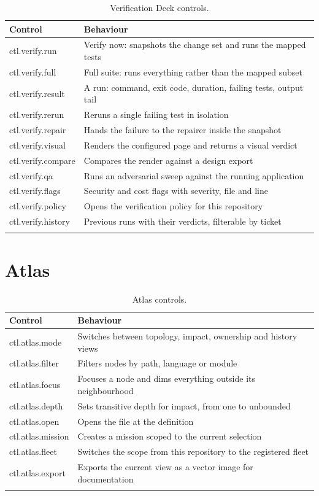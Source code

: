\begin{longtable}{@{}p{} p{}@{}}
\toprule
\textbf{Control} & \textbf{Behaviour} \\
\midrule
\endhead
ctl.verify.run & Verify now: snapshots the change set and runs the mapped tests \\
ctl.verify.full & Full suite: runs everything rather than the mapped subset \\
ctl.verify.result & A run: command, exit code, duration, failing tests, output tail \\
ctl.verify.rerun & Reruns a single failing test in isolation \\
ctl.verify.repair & Hands the failure to the repairer inside the snapshot \\
ctl.verify.visual & Renders the configured page and returns a visual verdict \\
ctl.verify.compare & Compares the render against a design export \\
ctl.verify.qa & Runs an adversarial sweep against the running application \\
ctl.verify.flags & Security and cost flags with severity, file and line \\
ctl.verify.policy & Opens the verification policy for this repository \\
ctl.verify.history & Previous runs with their verdicts, filterable by ticket \\
\bottomrule
\caption{Verification Deck controls.}
\end{longtable}

\section{Atlas}

\begin{longtable}{@{}p{} p{}@{}}
\toprule
\textbf{Control} & \textbf{Behaviour} \\
\midrule
\endhead
ctl.atlas.mode & Switches between topology, impact, ownership and history views \\
ctl.atlas.filter & Filters nodes by path, language or module \\
ctl.atlas.focus & Focuses a node and dims everything outside its neighbourhood \\
ctl.atlas.depth & Sets transitive depth for impact, from one to unbounded \\
ctl.atlas.open & Opens the file at the definition \\
ctl.atlas.mission & Creates a mission scoped to the current selection \\
ctl.atlas.fleet & Switches the scope from this repository to the registered fleet \\
ctl.atlas.export & Exports the current view as a vector image for documentation \\
\bottomrule
\caption{Atlas controls.}
\end{longtable}

